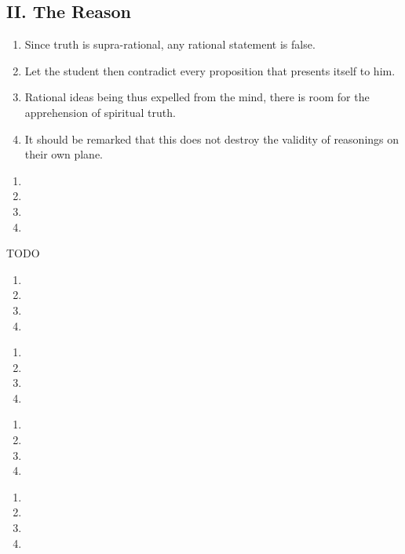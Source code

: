 \subsection*{II. The Reason}
\begin{enumerate}[label=\Roman*.]
\item Since truth is supra-rational, any rational statement is false.
\item Let the student then contradict every proposition that presents itself to him.
\item Rational ideas being thus expelled from the mind, there is room for the apprehension of spiritual truth.
\item[] It should be remarked that this does not destroy the validity of reasonings on their own plane.
\end{enumerate}

\begin{enumerate}[label=\Roman*.]
\item
\item
\item
\item[]
\end{enumerate}

TODO
\addsec*{}
\begin{enumerate}[label=\Roman*.]
\item
\item
\item
\item[]
\end{enumerate}

\addsec*{}
\begin{enumerate}[label=\Roman*.]
\item
\item
\item
\item[]
\end{enumerate}

\addsec*{}
\begin{enumerate}[label=\Roman*.]
\item
\item
\item
\item[]
\end{enumerate}

\addsec*{}
\begin{enumerate}[label=\Roman*.]
\item
\item
\item
\item[]
\end{enumerate}

